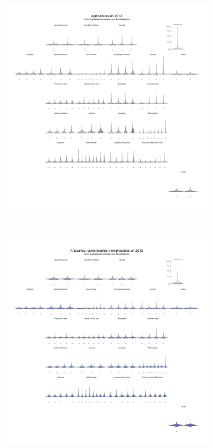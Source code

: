 \begin{figure}
	\centering
	\begin{subfigure}{0.235\textwidth}
	\includegraphics[width = \textwidth]{Figs/AED/Geofacet_Distr_por_Dpto_CSP1_2012}
	\end{subfigure}
	~
	\begin{subfigure}{0.235\textwidth}
	\includegraphics[width = \textwidth]{Figs/AED/Geofacet_Distr_por_Dpto_CSP2_2012}

\end{subfigure}
\end{figure}
